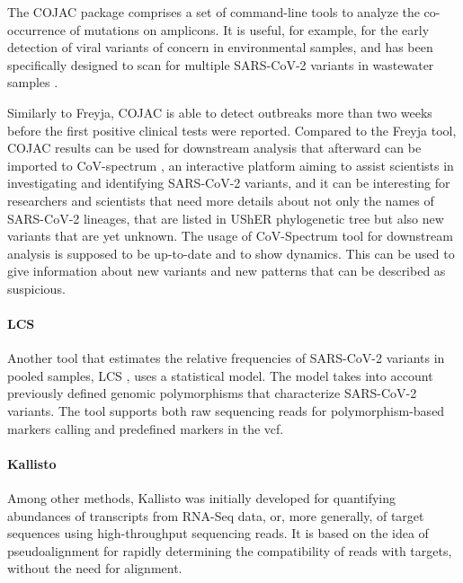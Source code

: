         The COJAC \cite{jahn2021,jahn2022} package comprises a set of command-line tools to analyze the co-occurrence of mutations on amplicons. It is useful, for example, for the early detection of viral variants of concern in environmental samples, and has been specifically designed to scan for multiple SARS-CoV-2 variants in wastewater samples \cite{cojac2022}.
        
        Similarly to Freyja, COJAC is able to detect outbreaks more than two weeks before the first positive clinical tests were reported. Compared to the Freyja tool, COJAC results can be used for downstream analysis that afterward can be imported to CoV-spectrum \cite{chen2022b}, an interactive platform aiming to assist scientists in investigating and identifying SARS-CoV-2 variants, and it can be interesting for researchers and scientists that need more details about not only the names of SARS-CoV-2 lineages, that are listed in UShER phylogenetic tree but also new variants that are yet unknown. The usage of CoV-Spectrum tool for downstream analysis is supposed to be up-to-date and to show dynamics. This can be used to give information about new variants and new patterns that can be described as suspicious.
        \paragraph{LCS}
        Another tool that estimates the relative frequencies of SARS-CoV-2 variants in pooled samples, LCS \cite{valieris2022}, uses a statistical model. The model takes into account previously defined genomic polymorphisms that characterize SARS-CoV-2 variants. The tool supports both raw sequencing reads for polymorphism-based markers calling and predefined markers in the \acrlong{vcf}.
        \paragraph{Kallisto}
        Among other methods, Kallisto \cite{bray2016} was initially developed for quantifying abundances of transcripts from RNA-Seq data, or, more generally, of target sequences using high-throughput sequencing reads. It is based on the idea of pseudoalignment for rapidly determining the compatibility of reads with targets, without the need for alignment. 
        
